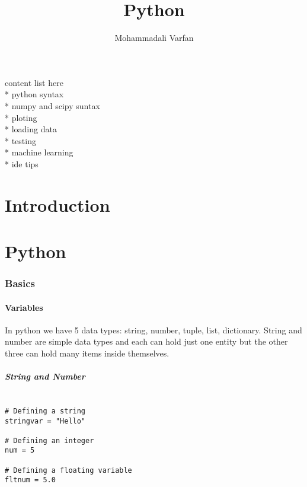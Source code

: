 \documentclass{article}
\title{Python}
\author{Mohammadali Varfan}
\begin{document}
\maketitle
content list here \\*
python syntax \\*
numpy and scipy suntax \\*
ploting \\*
loading data \\*
testing\\*
machine learning \\*
ide tips

\part{Introduction}

\part{Python}
\section{Basics}

\subsection{Variables}
In python we have 5 data types: string, number, tuple, list, dictionary. String and number are simple data types and each can hold just one entity but the other three can hold many items inside themselves.

\subsubsection{String and Number}
\begin{lstlisting}

# Defining a string
stringvar = "Hello"

# Defining an integer
num = 5

# Defining a floating variable
fltnum = 5.0

\end{lstlisting}
\end{document}
